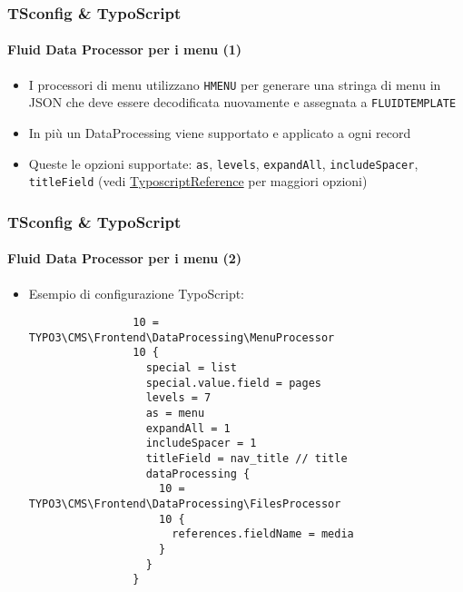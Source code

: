\begin{frame}[fragile]
	\frametitle{TSconfig \& TypoScript}
	\framesubtitle{Fluid Data Processor per i menu (1)}

	\begin{itemize}
		\item I processori di menu utilizzano \texttt{HMENU} per generare una stringa di menu in JSON
			che deve essere decodificata nuovamente e assegnata a \texttt{FLUIDTEMPLATE}
		\item In più un DataProcessing viene supportato e applicato a ogni record
		\item Queste le opzioni supportate: \texttt{as}, \texttt{levels}, \texttt{expandAll}, \texttt{includeSpacer},
			\texttt{titleField}
			(vedi \href{https://docs.typo3.org/typo3cms/TyposcriptReference/ContentObjects/Hmenu/Index.html}{TyposcriptReference} per maggiori opzioni)
	\end{itemize}

\end{frame}

\begin{frame}[fragile]
	\frametitle{TSconfig \& TypoScript}
	\framesubtitle{Fluid Data Processor per i menu (2)}

	\lstset{basicstyle=\tiny\ttfamily}

	\begin{itemize}
		\item Esempio di configurazione TypoScript:

			\begin{lstlisting}
				10 = TYPO3\CMS\Frontend\DataProcessing\MenuProcessor
				10 {
				  special = list
				  special.value.field = pages
				  levels = 7
				  as = menu
				  expandAll = 1
				  includeSpacer = 1
				  titleField = nav_title // title
				  dataProcessing {
				    10 = TYPO3\CMS\Frontend\DataProcessing\FilesProcessor
				    10 {
				      references.fieldName = media
				    }
				  }
				}
			\end{lstlisting}

	\end{itemize}

\end{frame}


